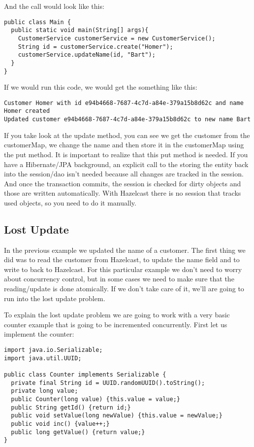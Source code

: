 And the call would look like this:

\begin{verbatim}
public class Main {
  public static void main(String[] args){
    CustomerService customerService = new CustomerService();
    String id = customerService.create("Homer");
    customerService.updateName(id, "Bart");
  }
}
\end{verbatim}

If we would run this code, we would get the something like this:

\begin{verbatim}
Customer Homer with id e94b4668-7687-4c7d-a84e-379a15b8d62c and name Homer created
Updated customer e94b4668-7687-4c7d-a84e-379a15b8d62c to new name Bart
\end{verbatim}

If you take look at the update method, you can see we get the customer from the customerMap, we change the name and then store it in the customerMap using the put method. It is important to realize that this put method is needed. If you have a Hibernate/JPA background, an explicit call to the storing the entity back into the session/dao isn't needed because all changes are tracked in the session. And once the transaction commits, the session is checked for dirty objects and those are written automatically. With Hazelcast there is no session that tracks used objects, so you need to do it manually. 

\subsection{Lost Update}

In the previous example we updated the name of a customer. The first thing we did was to read the customer from Hazelcast, to update the name field and to write to back to Hazelcast. For this particular example we don't need to worry about concurrency control, but in some cases we need to make sure that the reading/update is done atomically. If we don't take care of it, we'll are going to run into the lost update problem.

To explain the lost update problem we are going to work with a very basic counter example that is
going to be incremented concurrently. First let us implement the counter:

\begin{verbatim}
import java.io.Serializable;
import java.util.UUID;

public class Counter implements Serializable {
  private final String id = UUID.randomUUID().toString();
  private long value;
  public Counter(long value) {this.value = value;}
  public String getId() {return id;}
  public void setValue(long newValue) {this.value = newValue;}
  public void inc() {value++;}
  public long getValue() {return value;}
}
\end{verbatim}

